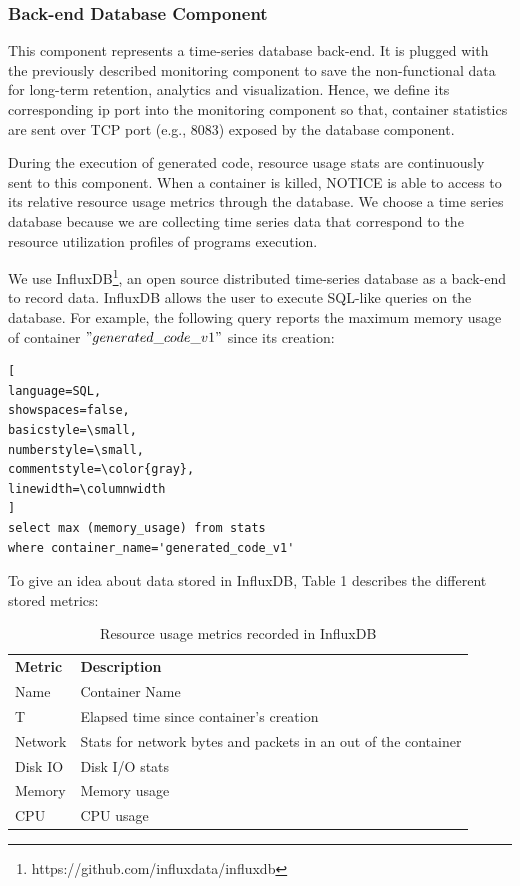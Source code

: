 \subsubsection{Back-end Database Component}
This component represents a time-series database back-end. It is plugged with the previously described monitoring component to save the non-functional data for long-term retention, analytics and visualization. Hence, we define its corresponding ip port into the monitoring component so that, container statistics are sent over TCP port (e.g., 8083) exposed by the database component.

During the execution of generated code, resource usage stats are continuously sent to this component. When a container is killed, NOTICE is able to access to its relative resource usage metrics through the database. We choose a time series database because we are collecting time series data that correspond to the resource utilization profiles of programs execution.

We use InfluxDB\footnote{https://github.com/influxdata/influxdb}, an open source distributed time-series database as a back-end to record data. InfluxDB allows the user to execute SQL-like queries on the database. For example, the following query reports the maximum memory usage of container $"generated\_code\_v1"$ since its creation:

\begin{lstlisting}[
language=SQL,
showspaces=false,
basicstyle=\small,
numberstyle=\small,
commentstyle=\color{gray},
linewidth=\columnwidth
]
select max (memory_usage) from stats 
where container_name='generated_code_v1'
\end{lstlisting}
To give an idea about data stored in InfluxDB, Table 1 describes the different stored metrics:
 \begin{table}[h]
 	\begin{center}
 		\begin{tabular}{|p{1cm}|p{6.9cm}|}
 			\hline
 			 \textbf{Metric} & \textbf{Description} \\
 		\hhline{|=|=|}	
 			 Name & Container Name \\
 		
 			 T & Elapsed time since container's creation \\
 		
 			 Network &  Stats for network bytes and packets in an out of the container \\
 		
 			 Disk IO &  Disk I/O stats \\
 		
 			 Memory &  Memory usage \\
 			
 		   	 CPU &  CPU usage \\
 			\hline
 			
 		\end{tabular}
 		
 	\end{center}
 	\caption {Resource usage metrics recorded in InfluxDB}
 \end{table}
 
